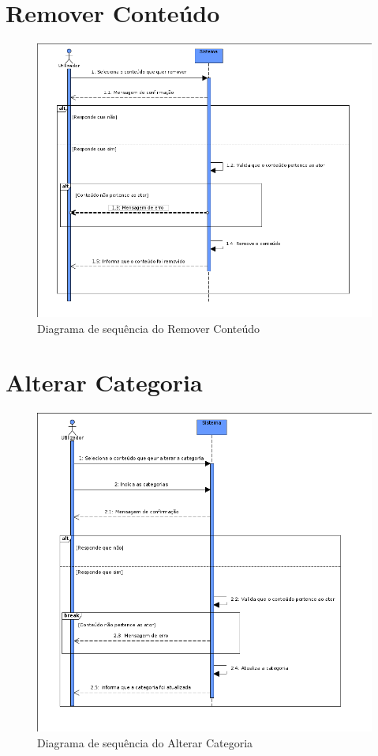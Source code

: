 \documentclass[a4paper]{report}
\begin{document}
\section{Remover Conteúdo}
\begin{figure}[H]
	\centering 
    \includegraphics[width=\textwidth]{images/remconteudoSeq.png}  
    \caption{Diagrama de sequência do Remover Conteúdo}
\end{figure}

\section{Alterar Categoria}
\begin{figure}[H]
	\centering 
    \includegraphics[width=\textwidth]{images/altcategoriaSeq.png}  
    \caption{Diagrama de sequência do Alterar Categoria}
\end{figure}
\end{document}
